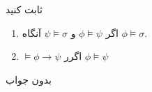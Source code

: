 ثابت کنید
\begin{enumerate}[label=(\alph*)]
\item
اگر
$\phi\models\psi$
و
$\psi\models\sigma$
آنگاه
$\phi\models\sigma$.

\item
$\models\phi\to\psi$
اگرر
$\phi\models\psi$
\end{enumerate}\quad
\begin{ans}
بدون جواب
\end{ans}
